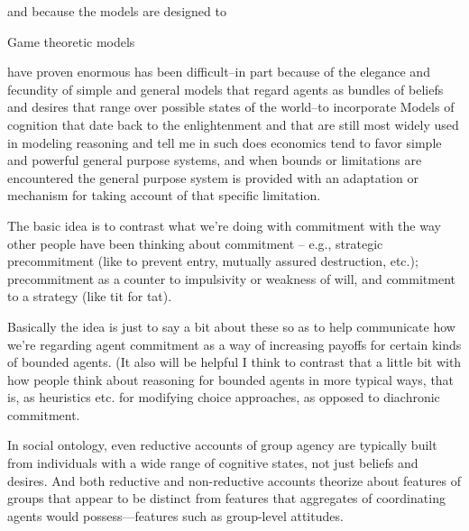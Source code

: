 \documentclass[
11pt,
titlepage,
reqno,
]{article}%
\theoremstyle{definition}
\begin{document}
and because the models are designed to 

Game theoretic models 

 have proven enormous has been difficult--in part because of the elegance and fecundity of simple and general models that regard agents as bundles of beliefs and desires that range over possible states of the world--to incorporate 
Models of cognition that date back to the enlightenment and that are still most widely used in modeling reasoning and tell me in such does economics tend to favor simple and powerful general purpose systems, and when bounds or limitations are encountered the general purpose system is provided with an adaptation or mechanism for taking account of that specific limitation.



The basic idea is to contrast what we're doing with commitment with the way other people have been thinking about commitment -- e.g., strategic precommitment (like to prevent entry, mutually assured destruction, etc.); precommitment as a counter to impulsivity or weakness of will, and commitment to a strategy (like tit for tat). 

Basically the idea is just to say a bit about these so as to help communicate how we're regarding agent commitment as a way of increasing payoffs for certain kinds of bounded agents. (It also will be helpful I think to contrast that a little bit with how people think about reasoning for bounded agents in more typical ways, that is, as heuristics etc. for modifying choice approaches, as opposed to diachronic commitment.


 
In social ontology, even reductive accounts of group agency are typically built from individuals with a wide range of cognitive states, not just beliefs and desires. And both reductive and non-reductive accounts theorize about features of groups that appear to be distinct from features that aggregates of coordinating agents would possess—features such as group-level attitudes.
\end{document}
